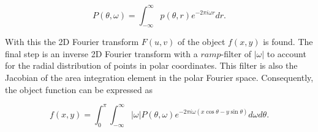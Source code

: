 \begin{equation}\label{eq:FBP_1}
    P(\theta, \omega) = \int_{-\infty}^{\infty} p(\theta,r)e^{-2\pi i\omega r} dr.
\end{equation}

With this the 2D Fourier transform $F(u,v)$ of the object $f(x,y)$ is found.
The final step is an inverse 2D Fourier transform with a $ramp$-filter of $|\omega|$ to account for the radial distribution of points in polar coordinates.
This filter is also the Jacobian of the area integration element in the polar Fourier space.
Consequently, the object function can be expressed as

\begin{equation}
    f(x,y) = \int_{0}^{\pi} \int_{-\infty}^{\infty} \left|\omega\right| P(\theta,\omega)e^{-2\pi i\omega (x\cos\theta - y\sin\theta)} d\omega d\theta.
\end{equation}







